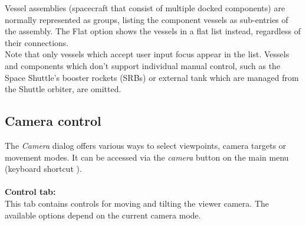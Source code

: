 \documentclass[Orbiter User Manual.tex]{subfiles}
\begin{document}
\noindent
Vessel assemblies (spacecraft that consist of multiple docked components) are normally represented as groups, listing the component vessels as sub-entries of the assembly. The Flat option shows the vessels in a flat list instead, regardless of their connections.\\
Note that only vessels which accept user input focus appear in the list. Vessels and components which don't support individual manual control, such as the Space Shuttle's booster rockets (SRBs) or external tank which are managed from the Shuttle orbiter, are omitted.


\subsection{Camera control}
The \textit{Camera} dialog offers various ways to select viewpoints, camera targets or movement modes. It can be accessed via the \textit{camera} button on the main menu (keyboard shortcut \Ctrl{}).\\
\\
\textbf{Control tab:}\\
This tab contains controls for moving and tilting the viewer camera. The available options depend on the current camera mode.

\begin{figure}[H]
	\centering
\end{figure}
\end{document}

